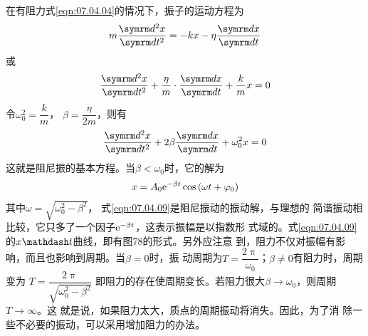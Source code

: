 在有阻力\lhbrak 式\eqref{eqn:07.04.04}\rhbrak 的情况下，振子的运动方程为
\begin{equation*}
  m \frac { \dif ^ { 2 } x } { \dif t ^ { 2 } } = - k x - \eta \frac { \dif x } { \dif t }
\end{equation*}
或
\begin{equation*}
  \frac { \dif ^ { 2 } x } { \dif t ^ { 2 } } + \frac { \eta } { m } \cdot \frac { \dif x } { \dif t } + \frac { k } { m } x = 0
\end{equation*}
令$ \omega _ 0 ^ { 2 } = \dfrac { k } { m }  $， $ \beta = \dfrac { \eta } { 2 m } $，则有
\begin{equation}\label{eqn:07.04.08}
  \frac { \dif ^ { 2 } x } { \dif t ^ { 2 } } + 2 \beta \frac { \dif x } { \dif t } + \omega _ { 0 } ^ { 2 } x = 0
\end{equation}
这就是阻尼振的基本方程。当$  \beta < \omega _ { 0 }   $时，它的解为
\begin{equation}\label{eqn:07.04.09}
  x = A _ { 0 } \mathrm e ^ { - \beta t } \cos \left( \omega t + \varphi _ { 0 } \right)
\end{equation}
其中$\omega = \sqrt { \omega _ 0 ^ { 2 } - \beta ^ { 2 } } $， 式\eqref{eqn:07.04.09}是阻尼振动的振动解，与理想的
简谐振动相比较，它只多了一个因子$ \mathrm e ^ { - \beta t } $，这表示振幅是以指数形
式域的。式\eqref{eqn:07.04.09}的$ x \mathdash t  $曲线，即有图78的形式。另外应注意
到，阻力不仅对振幅有影响，而且也影响到周期。当$  \beta = 0   $时，振
动周期为$ T = \dfrac { 2 \uppi } { \omega _ { 0 } }  $；$  \beta \ne 0   $有阻力时，周期变为
$ T = \dfrac { 2 \uppi } { \sqrt { \omega _ { 0 } ^ { 2 } - \beta ^ { 2 } } } $
即阻力的存在使周期变长。若阻力很大$ \beta \to \omega _ { 0 } $，则周期$ T \to \infty $。这
就是说，如果阻力太大，质点的周期振动将消失。因此，为了消
除一些不必要的振动，可以采用增加阻力的办法。